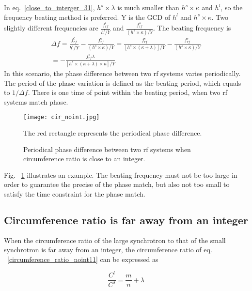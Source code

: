 In eq.~\ref{close_to_interger_31}, $h^s\times\lambda $ is much smaller than $h^s \times \kappa$ and $h^l$, so the frequency beating method is preferred. Y is the GCD of $h^l$ and $h^s \times \kappa$. Two slightly different frequencies are $\frac{f_{\mathit{rf}}^{l}}{h^l/Y}$ and $\frac{f_{\mathit{rf}}^{s}}{(h^s\times \kappa)/Y}$. The beating frequency is
\begin{equation} 
\begin{split}
\Delta f=\frac{f_{\mathit{rf}}^{l}}{h^l/Y}-\frac{f_{\mathit{rf}}^{s}}{(h^s\times \kappa)/Y}=\frac{f_{\mathit{rf}}^{s}}{[h^s\times (\kappa+\lambda)]/Y}-\frac{f_{\mathit{rf}}^{s}}{(h^s\times \kappa)/Y}\\=-\frac{f_{\mathit{rf}}^{s}\lambda}{[h^s\times (\kappa+\lambda)\times \kappa]/Y}
\label{cir_close_an_int}
\end{split}
\end{equation}
In this scenario, the phase difference between two rf systems varies periodically. The period of the phase variation is defined as the beating period, which equals to $1/\Delta f$. There is one time of point within the beating period, when two rf systems match phase. 
\begin{figure}[!htb]
   \centering   
   \texttt{[image: cir\_noint.jpg]}
   \caption{Periodical phase difference between two rf systems when circumference ratio is close to an integer.}{The red rectangle represents the periodical phase difference.}
   \label{cir_noint}
\end{figure} 

Fig. ~\ref{cir_noint} illustrates an example.
The beating frequency must not be too large in order to guarantee the precise of the phase match, but also not too small to satisfy the time constraint for the phase match. 

\subsection{Circumference ratio is far away from an integer}
When the circumference ratio of the large synchrotron to that of the small synchrotron is far away from an integer, the circumference ratio of eq. ~\ref{circumference_ratio_noint11} can be expressed as

\begin{equation}
\frac{C^l}{C^s}=\frac{m}{n}+ \lambda \label{circumference_ratio_noint11}
\end{equation}

